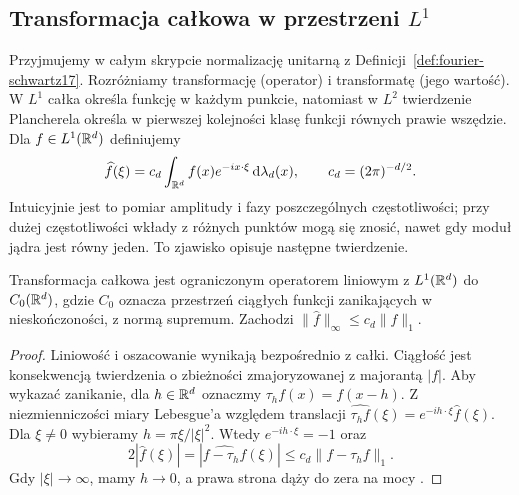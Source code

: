 \subsection{Transformacja całkowa w przestrzeni \texorpdfstring{$L^1$}{L1}}

Przyjmujemy w całym skrypcie normalizację unitarną z
Definicji~\ref{def:fourier-schwartz17}. Rozróżniamy
transformację (operator) i transformatę (jego wartość).
W $L^1$ całka określa funkcję w każdym punkcie, natomiast
w $L^2$ twierdzenie Plancherela określa w pierwszej
kolejności klasę funkcji równych prawie wszędzie.
Dla $f\in L^1(\mathbb R^d)$ definiujemy
\[
 \widehat f(\xi)=c_d\int_{\mathbb R^d}f(x)e^{-ix\cdot\xi}
 \,\mathrm d\lambda_d(x),\qquad c_d=(2\pi)^{-d/2}.
\]
Intuicyjnie jest to pomiar amplitudy i fazy poszczególnych
częstotliwości; przy dużej częstotliwości wkłady z różnych
punktów mogą się znosić, nawet gdy moduł jądra jest równy
jeden. To zjawisko opisuje następne twierdzenie.

\begin{twierdzenie}
\label{thm:dt-fourier-l1-rl}
Transformacja całkowa jest ograniczonym operatorem
liniowym z $L^1(\mathbb R^d)$ do $C_0(\mathbb R^d)$, gdzie $C_0$
oznacza przestrzeń ciągłych funkcji zanikających w
nieskończoności, z normą supremum. Zachodzi
$\|\widehat f\|_\infty\le c_d\|f\|_1$.
\end{twierdzenie}
\begin{proof}
Liniowość i oszacowanie wynikają bezpośrednio z całki.
Ciągłość jest konsekwencją twierdzenia o zbieżności
zmajoryzowanej z majorantą $|f|$.
Aby wykazać zanikanie, dla $h\in\mathbb R^d$ oznaczmy
$\tau_h f(x)=f(x-h)$. Z niezmienniczości miary
Lebesgue'a względem translacji
$\widehat{\tau_h f}(\xi)=e^{-ih\cdot\xi}\widehat f(\xi)$.
Dla $\xi\ne0$ wybieramy $h=\pi\xi/|\xi|^2$.
Wtedy $e^{-ih\cdot\xi}=-1$ oraz
\[
 2|\widehat f(\xi)|
 =|\widehat{f-\tau_h f}(\xi)|
 \le c_d\|f-\tau_h f\|_1.
\]
Gdy $|\xi|\to\infty$, mamy $h\to0$, a prawa strona
dąży do zera na mocy
.
\end{proof}

